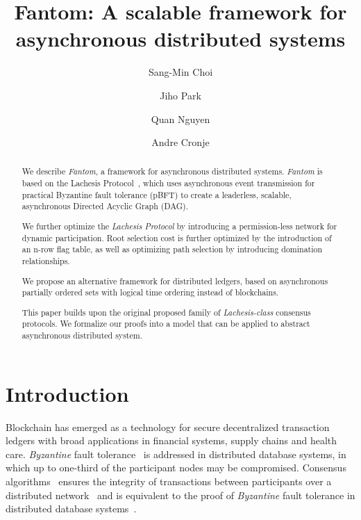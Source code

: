 \documentclass{article}
\title{Fantom: A scalable framework for asynchronous distributed systems}
\author{\large Sang-Min Choi}
\author{Jiho Park}
\author{Quan Nguyen}
\author{Andre Cronje}
\affil{FANTOM Lab\\ FANTOM Foundation}
\begin{document}
\maketitle

\begin{abstract}
	We describe \emph{Fantom}, a framework for asynchronous distributed systems. \emph{Fantom} is based on the Lachesis Protocol~\cite{lachesis01}, which uses asynchronous event transmission for practical Byzantine fault tolerance (pBFT) to create a leaderless, scalable, asynchronous Directed Acyclic Graph (DAG).
	
	We further optimize the \emph{Lachesis Protocol} by introducing a permission-less network for dynamic participation. Root selection cost is further optimized by the introduction of an n-row flag table, as well as optimizing path selection by introducing domination relationships.
	
	We propose an alternative framework for distributed ledgers, based on asynchronous partially ordered sets with logical time ordering instead of blockchains.
	
	This paper builds upon the original proposed family of \emph{Lachesis-class} consensus protocols. We formalize our proofs into a model that can be applied to abstract asynchronous distributed system.
\end{abstract}



\newpage
{} 
\tableofcontents 
\newpage
\section{Introduction}\label{ch:intro}

Blockchain has emerged as a technology for secure decentralized  transaction ledgers with broad applications in financial systems, supply chains and health care.
\emph{Byzantine} fault tolerance~\cite{Lamport82} is addressed in distributed database systems, in which up to one-third of the participant nodes may be compromised. Consensus algorithms~\cite{bcbook15} ensures the integrity of transactions between participants over a distributed network~\cite{Lamport82} and is equivalent to the proof of \emph{Byzantine} fault tolerance in distributed database systems~\cite{randomized03, paxos01}. 
\end{document}
